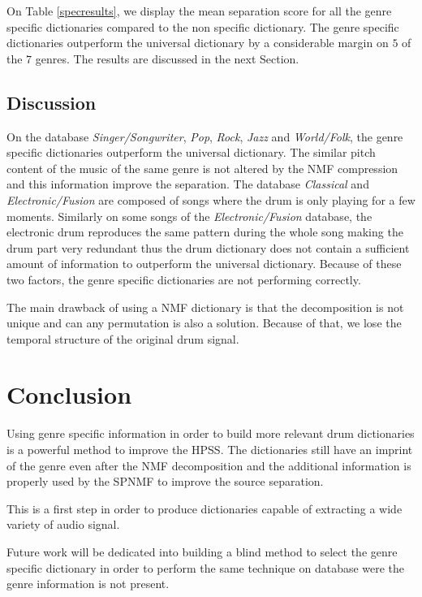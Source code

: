 \documentclass{article}
\begin{document}
On Table \ref{specresults}, we display the mean separation score for all the genre specific dictionaries compared to the non specific dictionary. The genre specific dictionaries outperform the universal dictionary by a considerable margin on $5$ of the $7$ genres. The results are discussed in the next Section.


\subsection{Discussion}


On the database \emph{Singer/Songwriter}, \emph{Pop}, \emph{Rock}, \emph{Jazz} and \emph{World/Folk}, the genre specific dictionaries outperform the universal dictionary. The similar pitch content of the music of the same genre is not altered by the NMF compression and this information improve the separation.  
The database \emph{Classical} and \emph{Electronic/Fusion} are composed of songs where the drum is only playing for a few moments. Similarly on some songs of the \emph{Electronic/Fusion} database, the electronic drum reproduces the same pattern during the whole song making the drum part very redundant thus the drum dictionary does not contain a sufficient amount of information to outperform the universal dictionary. Because of these two factors, the genre specific dictionaries are not performing correctly.




The main drawback of using a NMF dictionary is that the decomposition is not unique and can any permutation is also a solution. Because of that, we lose the temporal structure of the original drum signal. 



\section{Conclusion}

Using genre specific information in order to build more relevant drum dictionaries is a powerful method to improve the HPSS. The dictionaries still have an imprint of the genre even after the NMF decomposition and the additional information is properly used by the SPNMF to improve the source separation.

This is a first step in order to produce dictionaries capable of extracting a wide variety of audio signal.

Future work will be dedicated into building a blind method to select the genre specific dictionary in order to perform the same technique on database were the genre information is not present. 
\end{document}
